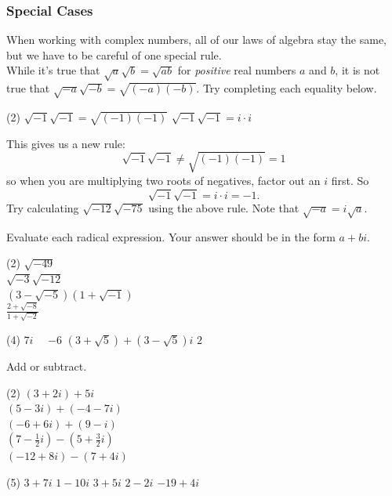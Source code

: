 \documentclass[12pt,fleqn]{book}
\newcommand{\prb}[1]{\begin{Exercise}#1\end{Exercise}}
\newcommand{\sol}[1]{\begin{Answer}#1\end{Answer}}
\begin{document}
\subsubsection*{Special Cases}
When working with complex numbers, all of our laws of algebra stay the same, but we have to be careful of one special rule.
\\[1em]
While it's true that $\sqrt{a}\sqrt{b}=\sqrt{ab}$ for \emph{positive} real numbers $a$ and $b$, it is not true that $\sqrt{-a}\sqrt{-b}=\sqrt{(-a)(-b)}$.  Try completing each equality below.
\begin{tasks}(2)
	\task $\sqrt{-1}\sqrt{-1} = \sqrt{(-1)(-1)}$
	\task $\sqrt{-1}\sqrt{-1} = i\cdot i$\\[4em]
\end{tasks}
This gives us a new rule:
\[
	\sqrt{-1}\sqrt{-1}\ne \sqrt{(-1)(-1)} = 1
\]
so when you are multiplying two roots of negatives, factor out an $i$ first.  So
\[
	\sqrt{-1}\sqrt{-1}=i\cdot i = -1.
\]
Try calculating $\sqrt{-12}\sqrt{-75}$ using the above rule.  Note that $\sqrt{-a}=i\sqrt{a}$.\\[4em]

\prb{Evaluate each radical expression.  Your answer should be in the form $a+bi$.
	\begin{tasks}(2)
		\task $\sqrt{-49}$ \\[4em]
		\task $\sqrt{-3} \sqrt{-12}$ \\[4em]
		\task $(3-\sqrt{-5})(1+\sqrt{-1})$ \\[4em]
		\task $\frac{2+\sqrt{-8}}{1+\sqrt{-2}}$ \\[4em]
	\end{tasks}
}

\sol{
	\begin{tasks}(4)
		\task $7 i \quad$
		\task $-6$
		\task $(3+\sqrt{5})+(3-\sqrt{5}) i$
		\task $2$
	\end{tasks}
}


\prb{Add or subtract.
	\begin{tasks}(2)
		\task $(3+2 i)+5 i$ \\[4em]
		\task $(5-3 i)+(-4-7 i)$ \\[4em]
		\task $(-6+6 i)+(9-i)$ \\[4em]
		\task $\left(7-\frac{1}{2}i\right)-\left(5+\frac{3}{2} i\right)$ \\[4em]
		\task $(-12+8 i)-(7+4 i)$ \\[4em]
	\end{tasks}
}

\sol{
	\begin{tasks}(5)
		\task $3+7 i$
		\task $1-10 i$
		\task $3+5 i$
		\task $2-2 i $
		\task $-19+4 i $
	\end{tasks}
}
\end{document}
